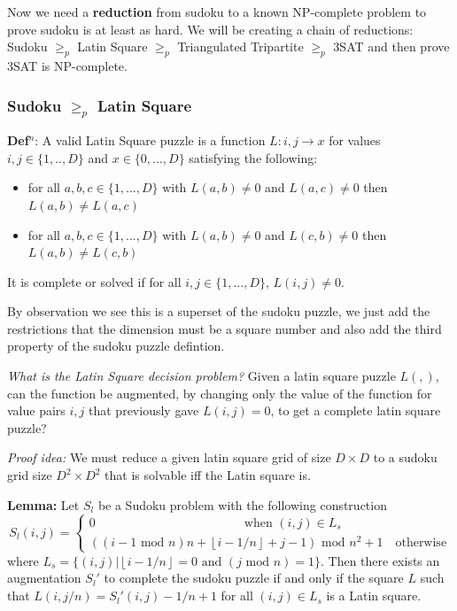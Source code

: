 \documentclass[a4paper,12pt]{article}
\begin{document}
Now we need a \textbf{reduction} from sudoku to a known NP-complete problem to prove sudoku is at least as hard. We will be creating a chain of reductions: Sudoku $\geq_p$  Latin Square $\geq_p$  Triangulated Tripartite $\geq_p$  3SAT and then prove 3SAT is NP-complete.




\subsubsection{Sudoku $\geq_p$ Latin Square}

\textbf{Def$^n$}: A valid Latin Square puzzle is a function $L:i,j \rightarrow x$ for values $i,j \in \{1,..,D\} $ and $x \in \{0,...,D\}$ satisfying the following:
\begin{itemize}
\item{for all $a,b,c \in \{1,...,D\}$ with $L(a,b) \neq 0 $ and $L(a,c) \neq 0$ then $L(a,b) \neq L(a,c)$}
\item{for all $a,b,c \in \{1,...,D\}$ with $L(a,b) \neq 0 $ and $L(c,b) \neq 0$ then $L(a,b) \neq L(c,b)$}
\end{itemize}
It is complete or solved if for all $i,j \in \{1,...,D\}$, $L(i,j) \neq 0$.

By observation we see this is a superset of the sudoku puzzle, we just add the restrictions that the dimension must be a square number and also add the third property of the sudoku puzzle defintion.

\textit{What is the Latin Square decision problem?} Given a latin square puzzle $L(,)$, can the function be augmented, by changing only the value of the function for value pairs $i,j$ that previously gave $L(i,j) =0$, to get a complete latin square puzzle?


\textit{Proof idea:} We must reduce a given latin square grid of size $D \times D$ to a sudoku grid size $D^2 \times D^2$ that is solvable iff the Latin square is. 

\textbf{Lemma:} Let $S_l$ be a Sudoku problem with the following construction 
\begin{equation}
	S_l(i,j) =\begin{cases}
0 \qquad\qquad\qquad\qquad\qquad\qquad\text{when } (i,j) \in L_s \\ 
((i-1 \text{ mod } n)n + \left\lfloor{i-1/n}\right\rfloor+j-1)\text{ mod } n^2 +1 \quad\text{otherwise}
\end{cases}
\end{equation}
where $L_s=\{(i,j)| \left\lfloor{i-1/n}\right\rfloor=0 \text{ and }(j \text{ mod }n)=1\}$. Then  there exists an augmentation $S_l'$ to complete the sudoku puzzle if and only if the square $L$ such that $L(i,j/n)=S_l'(i,j)-1/n+1$ for all $(i,j) \in L_s$ is a Latin square.
\end{document}
